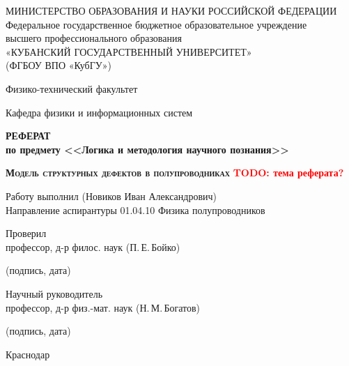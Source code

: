 \documentclass[a4paper, 14pt, titlepage]{extarticle}
\author{\theauthor,\\ кафедра физики и информационных систем КубГУ}
\title{\thetitle}
\date{\today{} \currenttime}
\newcommand{\todo}[1]{\textbf{\textcolor{red}{TODO: #1}}}
\newcommand{\thetitle}{Модель структурных дефектов в полупроводниках}
\begin{document}

  \maketitle
  \newpage

  \thispagestyle{empty}
  \begin {center}
  \small{МИНИСТЕРСТВО ОБРАЗОВАНИЯ И НАУКИ РОССИЙСКОЙ ФЕДЕРАЦИИ}\\
  Федеральное государственное бюджетное образовательное учреждение\\
  высшего профессионального образования\\
  «КУБАНСКИЙ ГОСУДАРСТВЕННЫЙ УНИВЕРСИТЕТ»\\
  (ФГБОУ ВПО «КубГУ»)

  Физико-технический факультет

  \vspace {1cm}

  Кафедра физики и информационных систем

  \vspace {5cm}

  \textbf{РЕФЕРАТ \\ по предмету <<Логика и методология научного познания>>}

  \vspace {0.5cm}

  \textbf{ \large \scshape \thetitle } \todo{тема реферата?}

  \vspace {1.5cm}

  \begin{flushleft}
    Работу выполнил \hrulefill{}  (Новиков Иван Александрович)\\
    Направление аспирантуры 01.04.10 Физика полупроводников

    Проверил\\
    профессор, д-р филос. наук \hrulefill{} (П.\,Е.\,Бойко)
    \\[-3mm]{\footnotesize\centering (подпись, дата)\par}

    Научный руководитель\\
    профессор, д-р физ.-мат. наук \hrulefill{} (Н.\,М.\,Богатов)
    \\[-3mm]{\footnotesize\centering (подпись, дата)\par}

  \end{flushleft}

  \vfill

  Краснодар \the\year
  \end {center}
\end{document}
